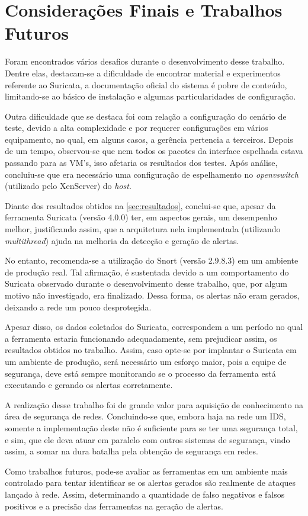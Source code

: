 \chapter{Considerações Finais e Trabalhos Futuros} \label{ch:considerações}

Foram encontrados vários desafios durante o desenvolvimento desse trabalho. Dentre elas, destacam-se a dificuldade de encontrar material e experimentos referente ao Suricata, a documentação oficial do sistema é pobre de conteúdo, limitando-se ao básico de instalação e algumas particularidades de configuração. 

Outra dificuldade que se destaca foi com relação a configuração do cenário de teste, devido a alta complexidade e por requerer configurações em vários equipamento, no qual, em alguns casos, a gerência pertencia a terceiros. Depois de um tempo, observou-se que nem todos os pacotes da interface espelhada estava passando para as VM's, isso afetaria os resultados dos testes. Após análise, concluiu-se que era necessário uma configuração de espelhamento no \textit{openvswitch} (utilizado pelo XenServer) do \textit{host}.

Diante dos resultados obtidos na \autoref{sec:resultados}, conclui-se que, apesar da ferramenta Suricata (versão 4.0.0) ter, em aspectos gerais, um desempenho melhor, justificando assim, que a arquitetura nela implementada (utilizando \textit{multithread}) ajuda na melhoria da detecção e geração de alertas. 

No entanto, recomenda-se a utilização do Snort (versão 2.9.8.3) em um ambiente de produção real. Tal afirmação, é sustentada devido a um comportamento do Suricata observado durante o desenvolvimento desse trabalho, que, por algum motivo não investigado, era finalizado. Dessa forma, os alertas não eram gerados, deixando a rede um pouco desprotegida.

Apesar disso, os dados coletados do Suricata, correspondem a um período no qual a ferramenta estaria funcionando adequadamente, sem prejudicar assim, os resultados obtidos no trabalho. Assim, caso opte-se por implantar o Suricata em um ambiente de produção, será necessário um esforço maior, pois a equipe de segurança, deve está sempre monitorando se o processo da ferramenta está executando e gerando os alertas corretamente.

A realização desse trabalho foi de grande valor para aquisição de conhecimento na área de segurança de redes. Concluindo-se que, embora haja na rede um IDS, somente a implementação deste não é suficiente para se ter uma segurança total, e sim, que ele deva atuar em paralelo com outros sistemas de segurança, vindo assim, a somar na dura batalha pela obtenção de segurança em redes. 

Como trabalhos futuros, pode-se avaliar as ferramentas em um ambiente mais controlado para tentar identificar se os alertas gerados são realmente de ataques lançado à rede. Assim, determinando a quantidade de falso negativos e falsos positivos e a precisão das ferramentas na geração de alertas.
